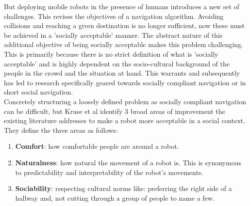 But deploying mobile robots in the presence of humans introduces a new set of challenges. This revises the objectives of a navigation algorithm. Avoiding collisions and reaching a given destination is no longer sufficient, now these must be achieved in a 'socially acceptable' manner. The abstract nature of this additional objective of being socially acceptable makes this problem challenging. This is primarily because there is no strict definition of what is 'socially acceptable' and is highly dependent on the socio-cultural background of the people in the crowd and the situation at hand. This warrants and subsequently has led to research specifically geared towards socially compliant navigation or in short social navigation.\\

Concretely structuring a loosely defined problem as socially compliant navigation can be difficult, but Kruse et al identify 3 broad areas of improvement the existing literature addresses to make a robot more acceptable in a social context. They define the three areas as follows:

\begin{enumerate}
	\item \textbf{Comfort}: how comfortable people are around a robot. 
	\item \textbf{Naturalness}: how natural the movement of a robot is. This is synonymous to predictability and interpretability of the robot's movements.
	\item \textbf{Sociability}: respecting cultural norms like: preferring the right side of a hallway and, not cutting through a group of people to name a few. %
\end{enumerate}

